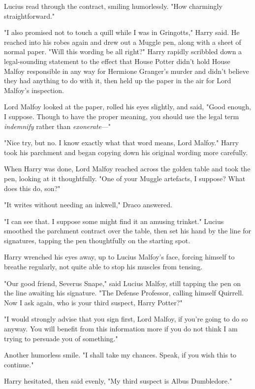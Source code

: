 Lucius read through the contract, smiling humorlessly. "How charmingly
straightforward."

"I also promised not to touch a quill while I was in Gringotts," Harry said. He
reached into his robes again and drew out a Muggle pen, along with a sheet of
normal paper. "Will this wording be all right?" Harry rapidly scribbled down a
legal-sounding statement to the effect that House Potter didn't hold House
Malfoy responsible in any way for Hermione Granger's murder and didn't believe
they had anything to do with it, then held up the paper in the air for Lord
Malfoy's inspection.

Lord Malfoy looked at the paper, rolled his eyes slightly, and said, "Good
enough, I suppose. Though to have the proper meaning, you should use the legal
term \emph{indemnify} rather than \emph{exonerate}—"

"Nice try, but no. I know exactly what that word means, Lord Malfoy." Harry
took his parchment and began copying down his original wording more carefully.

When Harry was done, Lord Malfoy reached across the golden table and took the
pen, looking at it thoughtfully. "One of your Muggle artefacts, I suppose? What
does this do, son?"

"It writes without needing an inkwell," Draco answered.

"I can see that. I suppose some might find it an amusing trinket." Lucius
smoothed the parchment contract over the table, then set his hand by the line
for signatures, tapping the pen thoughtfully on the starting spot.

Harry wrenched his eyes away, up to Lucius Malfoy's face, forcing himself to
breathe regularly, not quite able to stop his muscles from tensing.

"Our good friend, Severus Snape," said Lucius Malfoy, still tapping the pen on
the line awaiting his signature. "The Defense Professor, calling himself
Quirrell. Now I ask again, who is your third suspect, Harry Potter?"

"I would strongly advise that you sign first, Lord Malfoy, if you're going to
do so anyway. You will benefit from this information more if you do not think I
am trying to persuade you of something."

Another humorless smile. "I shall take my chances. Speak, if you wish this to
continue."

Harry hesitated, then said evenly, "My third suspect is Albus Dumbledore."

